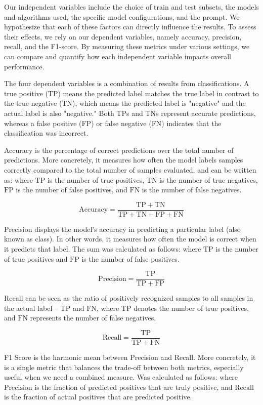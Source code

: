 Our independent variables include the choice of train and test subsets, the models and algorithms used, the specific model configurations, and the prompt. We hypothesize that each of these factors can directly influence the results. To assess their effects, we rely on our dependent variables, namely accuracy, precision, recall, and the F1-score. By measuring these metrics under various settings, we can compare and quantify how each independent variable impacts overall performance.

The four dependent variables is a combination of results from classifications.  A true positive (TP) means the predicted label matches the true label in contrast to the true negative (TN), which means the predicted label is "negative" and the actual label is also "negative." Both TPs and TNs represent accurate predictions, whereas a false positive (FP) or false negative (FN) indicates that the  classification was incorrect.

\medskip
Accuracy is the percentage of correct predictions over the total number of  predictions. More concretely, it measures how often the model labels samples  correctly compared to the total number of samples evaluated, and can be written  as: where $\mathrm{TP}$ is the number of true positives, $\mathrm{TN}$ is the  number of true negatives, $\mathrm{FP}$ is the number of false positives,  and $\mathrm{FN}$ is the number of false negatives.

$$
\mathrm{Accuracy} = \frac{\mathrm{TP} + \mathrm{TN}}
{\mathrm{TP} + \mathrm{TN} + \mathrm{FP} + \mathrm{FN}}
$$

\medskip
Precision displays the model’s accuracy in predicting a particular label (also known as class).  In other words, it measures how often the model is correct when it predicts that label. The sum was calculated as follows: where $\mathrm{TP}$ is the number of true positives and $\mathrm{FP}$ is the number of false positives.

$$
\mathrm{Precision} 
= \frac{\mathrm{TP}}{\mathrm{TP} + \mathrm{FP}}
$$

\medskip
Recall can be seen as the ratio of positively recognized samples to all samples  in the actual label -- $\mathrm{TP}$ and $\mathrm{FN}$, where $\mathrm{TP}$ denotes the number of true positives, and $\mathrm{FN}$ represents the number of false negatives.

$$
\mathrm{Recall} = \frac{\mathrm{TP}}{\mathrm{TP} + \mathrm{FN}}
$$

\medskip
F1 Score is the harmonic mean between Precision and Recall. More concretely, it is a single metric  that balances the trade-off between both metrics, especially useful when we need a combined measure.  Was calculated as follows: where $\mathrm{Precision}$ is the fraction of predicted positives that are  truly positive, and $\mathrm{Recall}$ is the fraction of actual positives that are predicted positive.

